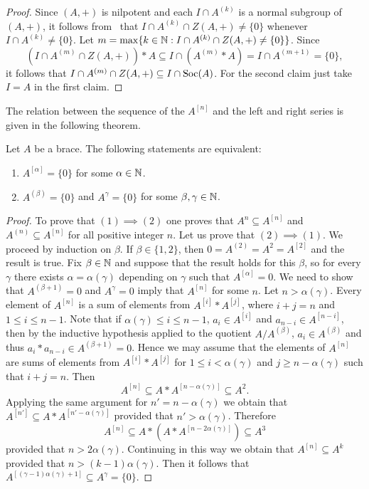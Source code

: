 \begin{proof}
    Since $(A,+)$ is nilpotent and each $I\cap A^{(k)}$ is a normal subgroup of $(A,+)$, it follows
    from~\cite[5.2.1]{MR1357169} that $I\cap A^{(k)}\cap Z(A,+)\ne\{0\}$ whenever
    $I\cap A^{(k)}\ne\{0\}$.
    Let
    $m=\max\{k\in\mathbb{N}:I\cap A^{(k)}\cap Z(A,+)\ne \{0\}\}$.
    Since
    \[
        (I\cap A^{(m)}\cap Z(A,+))*A\subseteq I\cap (A^{(m)}*A)=I\cap A^{(m+1)}=\{0\},
    \]
    it follows that $I\cap A^{(m)}\cap Z(A,+)\subseteq I\cap \operatorname{Soc}(A)$. 
    For the second claim just take $I=A$ in the first claim. 
\end{proof}

The relation between the sequence of the $A^{[n]}$ and the left and
right series is given in the following theorem.

\begin{theorem}
    \label{thm:equivalence}
    Let $A$ be a brace. The following statements are equivalent:
    \begin{enumerate}
        \item $A^{[\alpha]}=\{0\}$ for some $\alpha\in\mathbb{N}$.
        \item $A^{(\beta)}=\{0\}$ and $A^\gamma=\{0\}$ for some $\beta,\gamma\in\mathbb{N}$.
    \end{enumerate}
\end{theorem}

\begin{proof}
    To prove that $(1)\implies(2)$ one proves that $A^{n}\subseteq
    A^{[n]}$ and $A^{(n)}\subseteq A^{[n]}$
    for all positive integer $n$.
    Let us prove that
    $(2)\implies(1)$. We proceed by induction on $\beta$.  If
    $\beta\in\{1,2\}$, then $0=A^{(2)}=A^2=A^{[2]}$ and the result is true. Fix
    $\beta\in\mathbb{N}$ and suppose that the result holds for this $\beta$, so for
    every $\gamma$ there exists $\alpha=\alpha(\gamma)$ depending on $\gamma$
    such that $A^{[\alpha]}=0$.  We need to show that $A^{(\beta+1)}=0$ and
    $A^{\gamma}=0$ imply that $A^{[n]}$ for some $n$. Let $n>\alpha(\gamma)$.
    Every element of $A^{[n]}$ is a sum of elements from $A^{[i]}*A^{[j]}$,
    where $i+j=n$ and $1\leq i\leq n-1$. Note that if $\alpha(\gamma)\leq i\leq
    n-1$, $a_i\in A^{[i]}$ and $a_{n-i}\in A^{[n-i]}$, then by the inductive
    hypothesis applied to the quotient $A/A^{(\beta)}$, $a_i\in A^{(\beta)}$ and thus $a_i*a_{n-i}\in A^{(\beta
    +1)}=0$. Hence we may assume that the elements of $A^{[n]}$ are sums of
    elements from $A^{[i]}*A^{[j]}$ for $1\leq i<\alpha(\gamma)$ and $j\geq
    n-\alpha(\gamma)$ such that $i+j=n$. Then
    \[
    A^{[n]}\subseteq A*A^{[n-\alpha(\gamma)]}\subseteq A^2.
    \]
    Applying the same argument for $n'=n-\alpha(\gamma)$ we obtain that
    $A^{[n']}\subseteq A*A^{[n'-\alpha(\gamma)]}$ provided that
    $n'>\alpha(\gamma)$. Therefore
    \[
        A^{[n]}\subseteq A*(A*A^{[n-2\alpha(\gamma)]})\subseteq A^3
    \]
    provided that $n>2\alpha(\gamma)$. Continuing in this way we obtain that
    $A^{[n]}\subseteq A^{k}$
    provided that $n>(k-1)\alpha(\gamma)$.
    Then it follows that $A^{[(\gamma-1)\alpha(\gamma)+1]}\subseteq
    A^{\gamma}=\{0\}$.
\end{proof}


